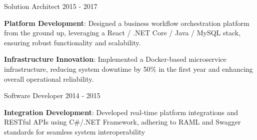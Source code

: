 \begin{cventries}
  \cventry
    {Solution Architect} %
    {} %
    {} %
    {} %
    {2015 - 2017} %
    {
      \begin{cvitems} %
        \item {\textbf{Platform Development}: Designed a business workflow orchestration platform from the ground up, leveraging a React / .NET Core / Java / MySQL stack, ensuring robust functionality and scalability.}
        \item {\textbf{Infrastructure Innovation}: Implemented a Docker-based microservice infrastructure, reducing system downtime by 50\% in the first year and enhancing overall operational reliability.}
      \end{cvitems}
    }

  \cventry
    {Software Developer} %
    {} %
    {} %
    {} %
    {2014 - 2015} %
    {
      \begin{cvitems} %
        \item {\textbf{Integration Development}: Developed real-time platform integrations and RESTful APIs using C\#/.NET Framework, adhering to RAML and Swagger standards for seamless system interoperability}
      \end{cvitems}
    }

\end{cventries}
